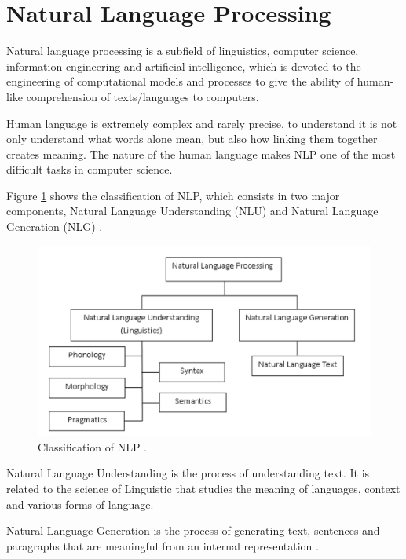 \newpage
\section{Natural Language Processing}
\label{sec:nlp}

Natural language processing is a subfield of linguistics, computer science, information engineering and artificial intelligence, which is devoted to the engineering of computational models and processes to give the ability of human-like comprehension of texts/languages to computers. \cite{Khurana2018}  

Human language is extremely complex and rarely precise, to understand it is not only understand what words alone mean, but also how linking them together creates meaning. The nature of the human language makes NLP one of the most difficult tasks in computer science. 

Figure \ref{fig:nlp_class} shows the classification of NLP, which consists in two major components, Natural Language Understanding (NLU) and Natural Language Generation (NLG) \cite{Khurana2018}.  \par




\begin{figure}[htb]
    \centering
    \includegraphics[scale = 0.3]{Sections/3StateOfTheArt/3_images/NLP_diagram.png}
    \caption{Classification of NLP \cite{Khurana2018}.}  
    \label{fig:nlp_class} 
\end{figure}

Natural Language Understanding is the process of understanding text. It is related to the science of Linguistic that studies the meaning of languages, context and various forms of language. 

Natural Language Generation is the process of generating text, sentences and
paragraphs that are meaningful from an internal representation \cite{Khurana2018}. 


